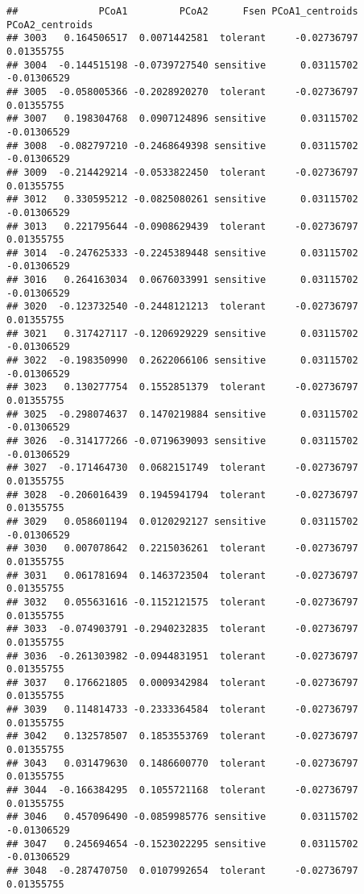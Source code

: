 \documentclass[
]{article}
\begin{document}
\begin{verbatim}
##              PCoA1         PCoA2      Fsen PCoA1_centroids PCoA2_centroids
## 3003   0.164506517  0.0071442581  tolerant     -0.02736797      0.01355755
## 3004  -0.144515198 -0.0739727540 sensitive      0.03115702     -0.01306529
## 3005  -0.058005366 -0.2028920270  tolerant     -0.02736797      0.01355755
## 3007   0.198304768  0.0907124896 sensitive      0.03115702     -0.01306529
## 3008  -0.082797210 -0.2468649398 sensitive      0.03115702     -0.01306529
## 3009  -0.214429214 -0.0533822450  tolerant     -0.02736797      0.01355755
## 3012   0.330595212 -0.0825080261 sensitive      0.03115702     -0.01306529
## 3013   0.221795644 -0.0908629439  tolerant     -0.02736797      0.01355755
## 3014  -0.247625333 -0.2245389448 sensitive      0.03115702     -0.01306529
## 3016   0.264163034  0.0676033991 sensitive      0.03115702     -0.01306529
## 3020  -0.123732540 -0.2448121213  tolerant     -0.02736797      0.01355755
## 3021   0.317427117 -0.1206929229 sensitive      0.03115702     -0.01306529
## 3022  -0.198350990  0.2622066106 sensitive      0.03115702     -0.01306529
## 3023   0.130277754  0.1552851379  tolerant     -0.02736797      0.01355755
## 3025  -0.298074637  0.1470219884 sensitive      0.03115702     -0.01306529
## 3026  -0.314177266 -0.0719639093 sensitive      0.03115702     -0.01306529
## 3027  -0.171464730  0.0682151749  tolerant     -0.02736797      0.01355755
## 3028  -0.206016439  0.1945941794  tolerant     -0.02736797      0.01355755
## 3029   0.058601194  0.0120292127 sensitive      0.03115702     -0.01306529
## 3030   0.007078642  0.2215036261  tolerant     -0.02736797      0.01355755
## 3031   0.061781694  0.1463723504  tolerant     -0.02736797      0.01355755
## 3032   0.055631616 -0.1152121575  tolerant     -0.02736797      0.01355755
## 3033  -0.074903791 -0.2940232835  tolerant     -0.02736797      0.01355755
## 3036  -0.261303982 -0.0944831951  tolerant     -0.02736797      0.01355755
## 3037   0.176621805  0.0009342984  tolerant     -0.02736797      0.01355755
## 3039   0.114814733 -0.2333364584  tolerant     -0.02736797      0.01355755
## 3042   0.132578507  0.1853553769  tolerant     -0.02736797      0.01355755
## 3043   0.031479630  0.1486600770  tolerant     -0.02736797      0.01355755
## 3044  -0.166384295  0.1055721168  tolerant     -0.02736797      0.01355755
## 3046   0.457096490 -0.0859985776 sensitive      0.03115702     -0.01306529
## 3047   0.245694654 -0.1523022295 sensitive      0.03115702     -0.01306529
## 3048  -0.287470750  0.0107992654  tolerant     -0.02736797      0.01355755

\end{verbatim}
\end{document}
